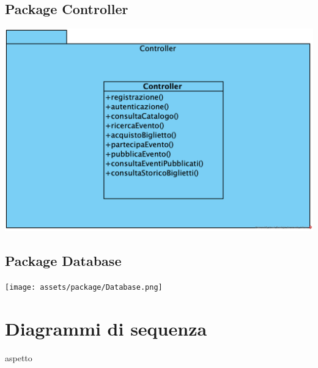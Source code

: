 \subsection{Package Controller}
\begin{center}	
	\vspace{1ex}
	\includegraphics[height=0.38\linewidth]{assets/package/Controller.png}
	\vspace{1ex}
\end{center}
\subsection{Package Database}
\begin{center}	
	\vspace{1ex}
	\texttt{[image: assets/package/Database.png]}
	\vspace{1ex}
\end{center}

\section{Diagrammi di sequenza}
aspetto
